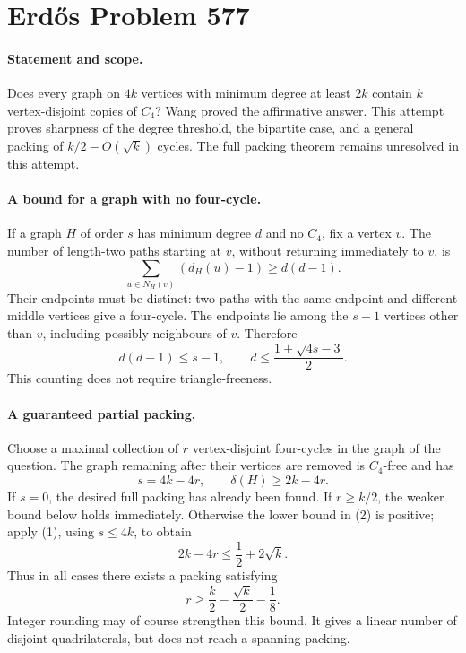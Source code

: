 \section*{Erd\H{o}s Problem 577}

\paragraph{Statement and scope.}
Does every graph on \(4k\) vertices with minimum degree at least \(2k\) contain \(k\) vertex-disjoint copies of \(C_4\)? Wang proved the affirmative answer. This attempt proves sharpness of the degree threshold, the bipartite case, and a general packing of \(k/2-O(\sqrt k)\) cycles. The full packing theorem remains unresolved in this attempt.

\paragraph{A bound for a graph with no four-cycle.}
If a graph \(H\) of order \(s\) has minimum degree \(d\) and no \(C_4\), fix a vertex \(v\). The number of length-two paths starting at \(v\), without returning immediately to \(v\), is
\[
 \sum_{u\in N_H(v)}(d_H(u)-1)\geq d(d-1).
\]
Their endpoints must be distinct: two paths with the same endpoint and different middle vertices give a four-cycle. The endpoints lie among the \(s-1\) vertices other than \(v\), including possibly neighbours of \(v\). Therefore
\[
 d(d-1)\leq s-1,
 \qquad d\leq\frac{1+\sqrt{4s-3}}2. \tag{1}
\]
This counting does not require triangle-freeness.

\paragraph{A guaranteed partial packing.}
Choose a maximal collection of \(r\) vertex-disjoint four-cycles in the graph of the question. The graph remaining after their vertices are removed is \(C_4\)-free and has
\[
 s=4k-4r,\qquad \delta(H)\geq2k-4r. \tag{2}
\]
If \(s=0\), the desired full packing has already been found. If \(r\geq k/2\), the weaker bound below holds immediately. Otherwise the lower bound in (2) is positive; apply (1), using \(s\leq4k\), to obtain
\[
 2k-4r\leq\frac12+2\sqrt k.
\]
Thus in all cases there exists a packing satisfying
\[
 r\geq\frac k2-\frac{\sqrt k}{2}-\frac18. \tag{3}
\]
Integer rounding may of course strengthen this bound. It gives a linear number of disjoint quadrilaterals, but does not reach a spanning packing.

